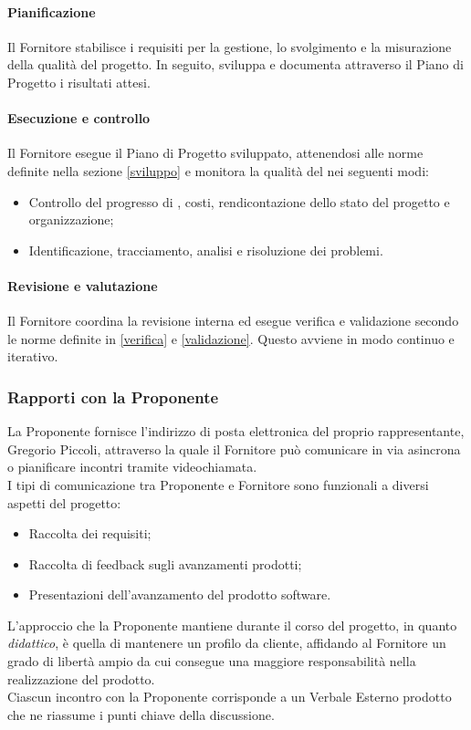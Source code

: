 \paragraph{Pianificazione}
Il Fornitore stabilisce i requisiti per la gestione, lo svolgimento e la misurazione della qualità del progetto. In seguito, sviluppa e documenta attraverso il Piano di Progetto i risultati attesi.

\paragraph{Esecuzione e controllo}
Il Fornitore esegue il Piano di Progetto sviluppato, attenendosi alle norme definite nella sezione \ref{sviluppo} e monitora la qualità del  nei seguenti modi:
\begin{itemize}
  \item Controllo del progresso di , costi, rendicontazione dello stato del progetto e organizzazione;
  \item Identificazione, tracciamento, analisi e risoluzione dei problemi.
\end{itemize}

\paragraph{Revisione e valutazione}
Il Fornitore coordina la revisione interna ed esegue verifica e validazione secondo le norme definite in \ref{verifica} e \ref{validazione}. Questo avviene in modo continuo e iterativo.

\subsubsection{Rapporti con la Proponente} La Proponente \Proponente{} fornisce l'indirizzo di posta elettronica del proprio rappresentante, Gregorio Piccoli, attraverso la quale il Fornitore può comunicare in via asincrona o pianificare incontri tramite videochiamata.\\
I tipi di comunicazione tra Proponente e Fornitore sono funzionali a diversi aspetti del progetto:
\begin{itemize}
  \item Raccolta dei requisiti;
  \item Raccolta di feedback sugli avanzamenti prodotti;
  \item Presentazioni dell'avanzamento del prodotto software.
\end{itemize}
L'approccio che la Proponente mantiene durante il corso del progetto, in quanto \textit{didattico}, è quella di mantenere un profilo da cliente, affidando al Fornitore un grado di libertà ampio da cui consegue una maggiore responsabilità nella realizzazione del prodotto.\\
Ciascun incontro con la Proponente corrisponde a un Verbale Esterno prodotto che ne riassume i punti chiave della discussione.



